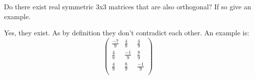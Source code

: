 Do there exist real symmetric 3x3 matrices that are also orthogonal? If so give an example.

Yes, they exist. As by definition they don't contradict each other. An example is:
\begin{equation*}
	\begin{pmatrix}
		\frac{-7}{9} & \frac{4}{9} &\frac{4}{9}\\
		\frac{4}{9} & \frac{-1}{9} &\frac{8}{9}\\
		\frac{4}{9} & \frac{8}{9} &\frac{-1}{9}\\
	\end{pmatrix}
\end{equation*}